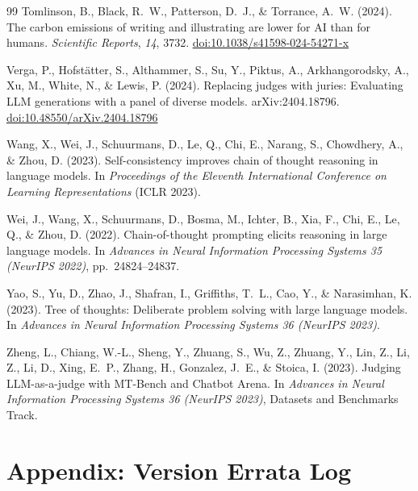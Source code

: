 \documentclass[12pt,a4paper]{article}
\begin{document}
\begin{thebibliography}{99}
Tomlinson, B., Black, R.~W., Patterson, D.~J., \& Torrance, A.~W. (2024).
The carbon emissions of writing and illustrating are lower for AI than for
  humans.
\textit{Scientific Reports}, \textit{14}, 3732.
\href{https://doi.org/10.1038/s41598-024-54271-x}{doi:10.1038/s41598-024-54271-x}

Verga, P., Hofst\"atter, S., Althammer, S., Su, Y., Piktus, A.,
  Arkhangorodsky, A., Xu, M., White, N., \& Lewis, P. (2024).
Replacing judges with juries: Evaluating LLM generations with a panel of diverse
  models.
arXiv:2404.18796.
\href{https://doi.org/10.48550/arXiv.2404.18796}{doi:10.48550/arXiv.2404.18796}

Wang, X., Wei, J., Schuurmans, D., Le, Q., Chi, E., Narang, S., Chowdhery, A.,
  \& Zhou, D. (2023).
Self-consistency improves chain of thought reasoning in language models.
In \textit{Proceedings of the Eleventh International Conference on Learning
  Representations} (ICLR 2023).

Wei, J., Wang, X., Schuurmans, D., Bosma, M., Ichter, B., Xia, F., Chi, E.,
  Le, Q., \& Zhou, D. (2022).
Chain-of-thought prompting elicits reasoning in large language models.
In \textit{Advances in Neural Information Processing Systems 35 (NeurIPS 2022)},
  pp.~24824--24837.

Yao, S., Yu, D., Zhao, J., Shafran, I., Griffiths, T.~L., Cao, Y., \&
  Narasimhan, K. (2023).
Tree of thoughts: Deliberate problem solving with large language models.
In \textit{Advances in Neural Information Processing Systems 36 (NeurIPS 2023)}.

Zheng, L., Chiang, W.-L., Sheng, Y., Zhuang, S., Wu, Z., Zhuang, Y., Lin, Z.,
  Li, Z., Li, D., Xing, E.~P., Zhang, H., Gonzalez, J.~E., \& Stoica, I.
  (2023).
Judging LLM-as-a-judge with MT-Bench and Chatbot Arena.
In \textit{Advances in Neural Information Processing Systems 36 (NeurIPS 2023)},
  Datasets and Benchmarks Track.

\end{thebibliography}

\clearpage
\section*{Appendix: Version Errata Log}
\end{document}
